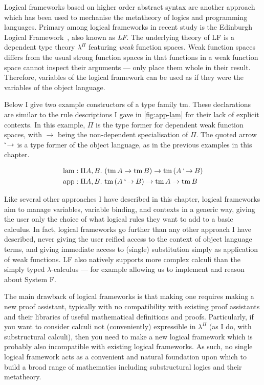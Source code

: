 Logical frameworks based on higher order abstract syntax are another approach
which has been used to mechanise the metatheory of logics and programming
languages.
Primary among logical frameworks in recent study is the Edinburgh Logical
Framework~\citep{HHP93}, also known as \emph{LF}.
The underlying theory of LF is a dependent type theory $\lambda^\Pi$ featuring
\emph{weak} function spaces.
Weak function spaces differs from the usual strong function spaces in that
functions in a weak function space cannot inspect their arguments --- only
place them whole in their result.
Therefore, variables of the logical framework can be used as if they were the
variables of the object language.

Below I give two example constructors of a type family $\mathrm{tm}$.
These declarations are similar to the rule descriptions I gave in
\cref{fig:app-lam} for their lack of explicit contexts.
In this example, $\Pi$ is the type former for dependent weak function spaces,
with $\to$ being the non-dependent specialisation of $\Pi$.
The quoted arrow $\mathbin{`\!\to}$ is a type former of the object language, as in the
previous examples in this chapter.

\begin{align*}
  \mathrm{lam} &: \Pi A,B.~\plr{\mathrm{tm}\,A \to \mathrm{tm}\,B} \to
                 \mathrm{tm}\,\plr{A \qto B} \\
  \mathrm{app} &: \Pi A,B.~\mathrm{tm}\,\plr{A \qto B} \to
                 \mathrm{tm}\,A \to \mathrm{tm}\,B
\end{align*}

Like several other approaches I have described in this chapter, logical
frameworks aim to manage variables, variable binding, and contexts in a generic
way, giving the user only the choice of what logical rules they want to add to a
basic calculus.
In fact, logical frameworks go further than any other approach I have described,
never giving the user reified access to the context of object language terms,
and giving immediate access to (single) substitution simply as application of
weak functions.
LF also natively supports more complex calculi than the simply typed
$\lambda$-calculus --- for example allowing us to implement and reason about
System F.

The main drawback of logical frameworks is that making one requires making a new
proof assistant, typically with no compatibility with existing proof assistants
and their libraries of useful mathematical definitions and proofs.
Particularly, if you want to consider calculi not (conveniently) expressible in
$\lambda^\Pi$ (as I do, with substructural calculi), then you need to make a new
logical framework which is probably also incompatible with existing logical
frameworks.
As such, no single logical framework acts as a convenient and natural foundation
upon which to build a broad range of mathematics including substructural logics
and their metatheory.
